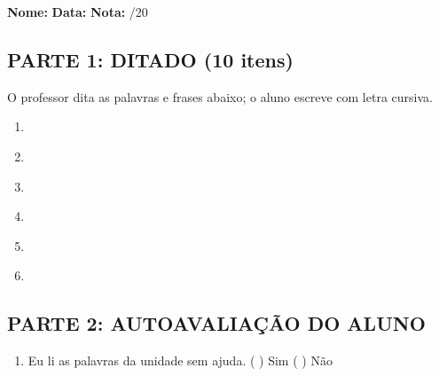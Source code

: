 

\begin{exercicio}

\noindent\textbf{Nome:} \underline{\hspace{3.2cm}} \quad \textbf{Data:} \underline{\hspace{1.6cm}} \quad \textbf{Nota:} \underline{\hspace{0.9cm}}/20


\subsection*{PARTE 1: DITADO (10 itens)}

O professor dita as palavras e frases abaixo; o aluno escreve com letra cursiva.

\begin{enumerate}

  \item \underline{\hspace{10.5cm}}

  \item \underline{\hspace{10.5cm}}

  \item \underline{\hspace{10.5cm}}

  \item \underline{\hspace{10.5cm}}

  \item \underline{\hspace{10.5cm}}

  \item \underline{\hspace{10.5cm}}

\end{enumerate}

\subsection*{PARTE 2: AUTOAVALIAÇÃO DO ALUNO}

\begin{enumerate}[label=\alph*)]

  \item Eu li as palavras da unidade sem ajuda.  \quad ( ) Sim   ( ) Não


\end{enumerate}
\end{exercicio}
